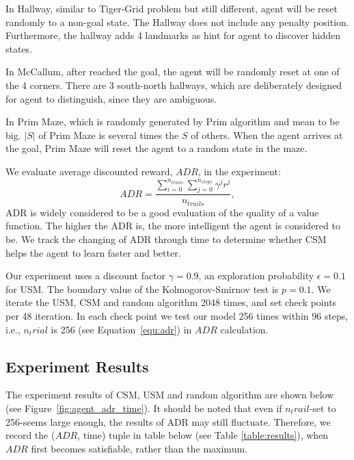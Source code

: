 \documentclass{article}
\begin{document}
In Hallway, similar to Tiger-Grid problem but still different, agent will be reset randomly
to a non-goal state. The Hallway does not include any penalty position. Furthermore, the hallway
adds 4 landmarks as hint for agent to discover hidden states.

In McCallum, after reached the goal, the agent will be randomly reset at one of the 4 corners.
There are 3 south-north hallways, which are deliberately designed for agent to distinguish, since
they are ambiguous. 

In Prim Maze, which is randomly generated by Prim algorithm and mean to be big. $|S|$ of Prim Maze
is several times the $S$ of others. When the agent arrives at the goal, Prim Maze will reset
the agent to a random state in the maze.

We evaluate average discounted reward, $ADR$, in the experiment:
\begin{equation}
  ADR = \frac{\sum_{i=0}^{n_{trails}} \sum_{j=0}^{n_{steps}} \gamma^j r^j}{n_{trails}}, \label{equ:adr}
\end{equation}
ADR is widely considered to be a good evaluation of the quality of a value function. The higher
the ADR is, the more intelligent the agent is considered to be. We track the changing of ADR through time
to determine whether CSM helps the agent to learn faster and better.
  
Our experiment uses a discount factor $\gamma=0.9$, an exploration probability $\epsilon=0.1$ for USM.
The boundary value of the Kolmogorov-Smirnov test is $p=0.1$. We iterate the USM, CSM and random algorithm
2048 times, and set check points per 48 iteration. In each check point we test our model 256 times
within 96 steps, i.e., $n_trial$ is 256 (see Equation~\ref{equ:adr}) in $ADR$ calculation.

\subsection{Experiment Results}

The experiment results of CSM, USM and random algorithm are shown below (see Figure~\ref{fig:agent_adr_time}).
It should be noted that even if $n_trail$-set to 256-seems large enough, the results of ADR may still fluctuate.
Therefore, we record the ($ADR$, time) tuple in table below (see Table \ref{table:results}), when $ADR$ first
becomes satisfiable, rather than the maximum.
\end{document}
